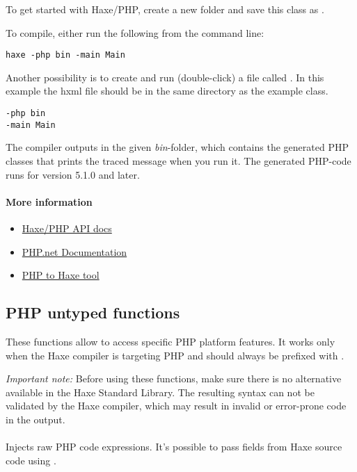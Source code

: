 To get started with Haxe/PHP, create a new folder and save this class as .


To compile, either run the following from the command line:

\begin{lstlisting}
haxe -php bin -main Main
\end{lstlisting}

Another possibility is to create and run (double-click) a file called . In this example the hxml file should be in the same directory as the example class.

\begin{lstlisting}
-php bin
-main Main
\end{lstlisting}

The compiler outputs in the given \emph{bin}-folder, which contains the generated PHP classes that prints the traced message when you run it. The generated PHP-code runs for version 5.1.0 and later.

\paragraph{More information}

\begin{itemize}
	\item \href{https://api.haxe.org/php/}{Haxe/PHP API docs}
	\item \href{http://php.net/docs.php}{PHP.net Documentation}
	\item \href{http://phptohaxe.haqteam.com/code.php}{PHP to Haxe tool}
\end{itemize}


\subsection{PHP untyped functions}
\label{target-php-untyped}

These functions allow to access specific PHP platform features. It works only when the Haxe compiler is targeting PHP and should always be prefixed with . 

\emph{Important note:} Before using these functions, make sure there is no alternative available in the Haxe Standard Library. The resulting syntax can not be validated by the Haxe compiler, which may result in invalid or error-prone code in the output.

\paragraph{}
Injects raw PHP code expressions. It's possible to pass fields from Haxe source code using .


